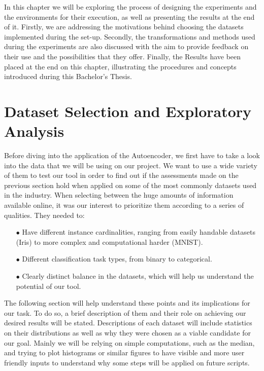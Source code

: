 In this chapter we will be exploring the process of designing the experiments and the environments for their execution, as well as presenting the results at the end of it. Firstly, we are addressing the motivations behind choosing the datasets implemented during the set-up. Secondly, the transformations and methods used during the experiments are also discussed with the aim to provide feedback on their use and the possibilities that they offer. Finally, the Results have been placed at the end on this chapter, illustrating the procedures and concepts introduced during this Bachelor's Thesis.

\section{Dataset Selection and Exploratory Analysis}

Before diving into the application of the Autoencoder, we first have to take a look into the data that we will be using on our project. We want to use a wide variety of them to test our tool in order to find out if the assessments made on the previous section hold when applied on some of the most commonly datasets used in the industry. When selecting between the huge amounts of information available online, it was our interest to prioritize them according to a series of qualities. They needed to:
 
\begin{itemize}
	
\item[$\bullet$] Have different instance cardinalities, ranging from easily handable datasets (Iris) to more complex and computational harder (MNIST).

\item[$\bullet$] Different classification task types, from binary to categorical.

\item[$\bullet$] Clearly distinct balance in the datasets, which will help us understand the potential of our tool.

\end{itemize}

The following section will help understand these points and its implications for our task. To do so, a brief description of them and their role on achieving our desired results will be stated. Descriptions of each dataset will include statistics on their distributions as well as why they were chosen as a viable candidate for our goal. Mainly we will be relying on simple computations, such as the median, and trying to plot histograms or similar figures to have visible and more user friendly inputs to understand why some steps will be applied on future scripts.\par
 
